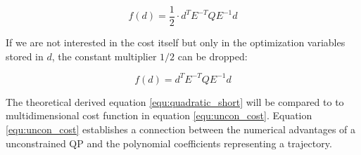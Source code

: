 \begin{equation}
 f(d)  = \frac{1}{2} \cdot d^T  E^{-T}  Q  E^{-1}  d 
\label{equ:quadratic_simple}
\end{equation}

If we are not interested  in the cost itself but only in the optimization variables stored in $d$, the constant multiplier $1/2$ can be dropped:

\begin{equation}
 f(d)  = d^T  E^{-T}  Q  E^{-1}  d 
\label{equ:quadratic_short}
\end{equation}

The theoretical derived equation \ref{equ:quadratic_short} will be compared to to multidimensional cost function in equation \ref{equ:uncon_cost}. Equation \ref{equ:uncon_cost} establishes a connection between the numerical advantages of a unconstrained QP and the polynomial coefficients representing a trajectory.












